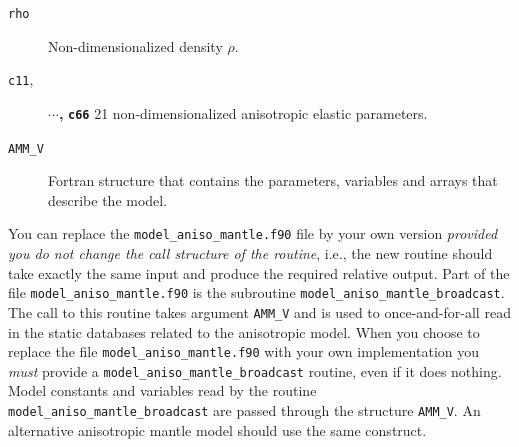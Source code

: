 \documentclass[oneside,english]{book}
\begin{document}
\begin{description}
\item [{\texttt{rho}}] Non-dimensionalized density $\rho$.
\item [{\texttt{c11},}] \textbf{$\cdots$,} \texttt{\textbf{c66}} 21 non-dimensionalized
anisotropic elastic parameters.
\item [{\texttt{AMM\_V}}] Fortran structure that contains the parameters,
variables and arrays that describe the model.
\end{description}
You can replace the \texttt{model\_aniso\_mantle.f90} file by
your own version \textit{provided you do not change the call structure
of the routine}, i.e., the new routine should take exactly the same
input and produce the required relative output. Part of the file \texttt{model\_aniso\_mantle.f90}
is the subroutine \texttt{model\_aniso\_mantle\_broadcast}. The call to
this routine takes argument \texttt{AMM\_V} and is used to once-and-for-all
read in the static databases related to the anisotropic model. When
you choose to replace the file \texttt{model\_aniso\_mantle.f90}
with your own implementation you \textit{must} provide a \texttt{model\_aniso\_mantle\_broadcast}
routine, even if it does nothing. Model constants and variables read
by the routine \texttt{model\_aniso\_mantle\_broadcast} are passed through the
structure \texttt{AMM\_V}. An alternative anisotropic mantle model
should use the same construct.
\end{document}
